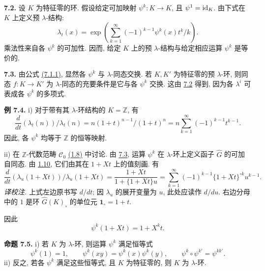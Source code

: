 \textbf{7.2.} 设 \(K\) 为特征零的环. 假设给定可加映射 \(\psi^k:K\to K\), 且 \(\psi^1=\operatorname{id}_K\). 由下式在 \(K\) 上定义预 \(\lambda\)-结构:
\begin{equation}\tag{7.2.1}
  \lambda_t(x)=
  \exp\left(\sum_{k=1}^{\infty}(-1)^{k-1}\psi^k(x)t^k/k\right).
\end{equation}
乘法性来自各 \(\psi^k\) 的可加性. 因而, 给定 \(K\) 上的预 \(\lambda\)-结构与给定相应运算 \(\psi^k\) 是等价的.

\textbf{7.3.} 由公式 \hyperlink{sga6.e05.eq.7-1-1}{(7.1.1)}, 显然各 \(\psi^k\) 与 \(\lambda\)-同态交换. 若 \(K,K'\) 为特征零的预 \(\lambda\)-环, 则同态 \(f:K\to K'\) 为 \(\lambda\)-同态的充要条件是它与各 \(\psi^k\) 交换. 这由 \hyperlink{sga6.e05.para.7-2}{7.2} 得到, 因为各 \(\lambda^i\) 可表成各 \(\psi^k\) 的多项式.

\textbf{例 7.4.} i) 对于带有其 \(\lambda\)-环结构的 \(K=\mathbb Z\), 有
\[
  \frac{d}{dt}(\lambda_t(n))/\lambda_t(n)
  =
  n(1+t)^{n-1}/(1+t)^n
  =
  n\sum_{k=1}^{\infty}(-1)^{k-1}t^{k-1}.
\]
因此, 各 \(\psi^k\) 均等于 \(\mathbb Z\) 的恒等映射.

ii) 在 \(\mathbb Z\)-代数范畴 \(\mathscr C_0\) \hyperlink{sga6.e05.para.1-8}{(1.8)} 中讨论. 由 \hyperlink{sga6.e05.para.7-3}{7.3}, 运算 \(\psi^k\) 在 \(\lambda\)-环上定义函子 \(\widehat G\) 的可加自同态. 由 \hyperlink{sga6.e05.thm.1-10}{1.10}, 它们由其在 \(1+Xt\) 上的值刻画. 有
\[
  \frac{d}{dt}(\lambda_u(1+Xt))/\lambda_u(1+Xt)
  =
  \frac{1+Xt}{1+\{1+Xt\}u}
  =
  \sum_{k=1}^{\infty}(-1)^{k-1}\{1+Xt\}^{\circ k}u^{k-1}.
\]
\emph{译校注.} 上式左边原书写 \(d/dt\); 因 \(\lambda_u\) 的展开变量为 \(u\), 此处应读作 \(d/du\). 右边分母中的 \(1\) 是环 \(\widehat G(K)_{\circ}\) 的单位元 \(\mathbf1_{\circ}=1+t\).

因此
\begin{equation}\tag{7.4.1}
  \psi^k(1+Xt)=1+X^k t.
\end{equation}

\textbf{命题 7.5.} i) 若 \(K\) 为 \(\lambda\)-环, 则运算 \(\psi^k\) 满足恒等式
\begin{equation}\tag{7.5.1}
  \psi^k(1)=1,\qquad
  \psi^k(xy)=\psi^k(x)\psi^k(y),\qquad
  \psi^k\circ\psi^{k'}=\psi^{kk'}.
\end{equation}
ii) 反之, 若各 \(\psi^k\) 满足这些恒等式, 且 \(K\) 为特征零的, 则 \(K\) 为 \(\lambda\)-环.

